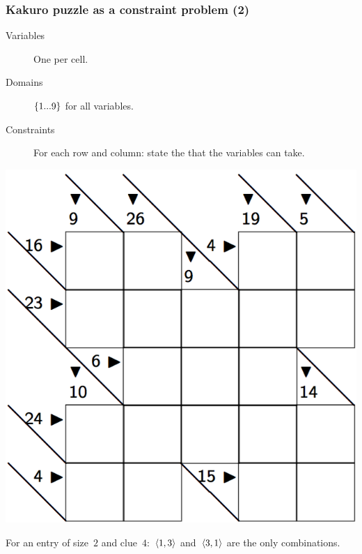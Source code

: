 \documentclass{beamer}
\newcommand{\stressed}[1]{\emph{{\color{red!50}{#1}}}}
\begin{document}
\begin{frame}
  \frametitle{Kakuro puzzle as a constraint problem (2)}
  \begin{minipage}{0.5\textwidth}
    \begin{description}
      \item[Variables] One per cell.
      \item[Domains] $\left\{1...9\right\}$ for all variables.
      \item[Constraints] For each row and column: state the \stressed{possible
        combinations of values} that the variables can take.
    \end{description} 
  \end{minipage}
  \begin{minipage}{0.45\textwidth}
    \includegraphics[scale=0.2]{kakuro.png}
  \end{minipage}

  \bigskip
  For an entry of size~$2$ and clue~$4$:~$\left\langle1,3\right\rangle$ and~$\left\langle3,1\right\rangle$
  are the only combinations.
\end{frame}
\end{document}
